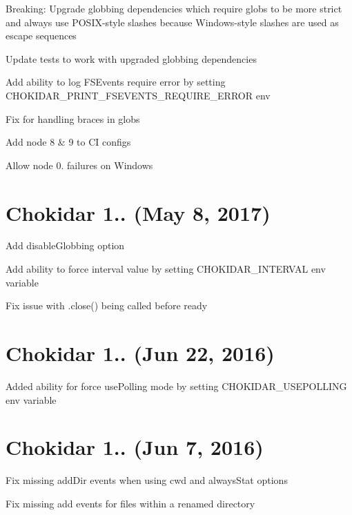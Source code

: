 \begin{DoxyItemize}
\item Breaking\+: Upgrade globbing dependencies which require globs to be more strict and always use P\+O\+S\+I\+X-\/style slashes because Windows-\/style slashes are used as escape sequences
\item Update tests to work with upgraded globbing dependencies
\item Add ability to log F\+S\+Events require error by setting {\ttfamily C\+H\+O\+K\+I\+D\+A\+R\+\_\+\+P\+R\+I\+N\+T\+\_\+\+F\+S\+E\+V\+E\+N\+T\+S\+\_\+\+R\+E\+Q\+U\+I\+R\+E\+\_\+\+E\+R\+R\+OR} env
\item Fix for handling braces in globs
\item Add node 8 \& 9 to CI configs
\item Allow node 0. failures on Windows
\end{DoxyItemize}

\section*{Chokidar 1.. (May 8, 2017)}


\begin{DoxyItemize}
\item Add {\ttfamily disable\+Globbing} option
\item Add ability to force interval value by setting C\+H\+O\+K\+I\+D\+A\+R\+\_\+\+I\+N\+T\+E\+R\+V\+AL env variable
\item Fix issue with {\ttfamily .close()} being called before {\ttfamily ready}
\end{DoxyItemize}

\section*{Chokidar 1.. (Jun 22, 2016)}


\begin{DoxyItemize}
\item Added ability for force {\ttfamily use\+Polling} mode by setting {\ttfamily C\+H\+O\+K\+I\+D\+A\+R\+\_\+\+U\+S\+E\+P\+O\+L\+L\+I\+NG} env variable
\end{DoxyItemize}

\section*{Chokidar 1.. (Jun 7, 2016)}


\begin{DoxyItemize}
\item Fix missing {\ttfamily add\+Dir} events when using {\ttfamily cwd} and {\ttfamily always\+Stat} options
\item Fix missing {\ttfamily add} events for files within a renamed directory
\end{DoxyItemize}


